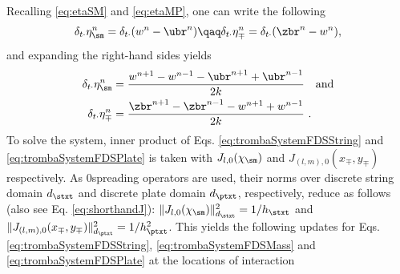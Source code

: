 Recalling \eqref{eq:etaSM} and \eqref{eq:etaMP}, one can write the following
\begin{equation*}
    \delta_{t\cdot}\eta_\sm^n = \delta_{t\cdot}(w^n - \ubr^n) \qaq\delta_{t\cdot}\eta_\mp^n = \delta_{t\cdot}(\zbr^n - w^n),
\end{equation*}
and expanding the right-hand sides yields
\begin{equation}\label{eq:expandedEtas}
\begin{aligned}
    \delta_{t\cdot}\eta_\sm^n &= \frac{w^{n+1}-w^{n-1}-\ubr^{n+1}+\ubr^{n-1}}{2k} \quad \text{and}\\ \delta_{t\cdot}\eta_\mp^n &= \frac{\zbr^{n+1}-\zbr^{n-1}-w^{n+1}+w^{n-1}}{2k}\ .
    \end{aligned}
\end{equation}
To solve the system, inner product of Eqs. \eqref{eq:trombaSystemFDSString} and \eqref{eq:trombaSystemFDSPlate} is taken with $J_{l,0}(\chi_\sm)$ and $J_{(l,m),0}(x_\mp, y_\mp)$ respectively. As $0$\thOrder spreading operators are used, their norms over discrete string domain $d_\stxt$ and discrete plate domain $d_\ptxt$, respectively, reduce as follows (also see Eq. \eqref{eq:shorthandJ}): $\lVert J_{l,0}(\chi_\sm) \rVert_{d_\stxt}^2 = 1/h_\stxt$ and $\lVert J_{(l,m),0}(x_\mp, y_\mp)\rVert_{d_\ptxt}^2 = 1/h_\ptxt^2$. This yields the following updates for Eqs. \eqref{eq:trombaSystemFDSString}, \eqref{eq:trombaSystemFDSMass} and \eqref{eq:trombaSystemFDSPlate} at the locations of interaction
